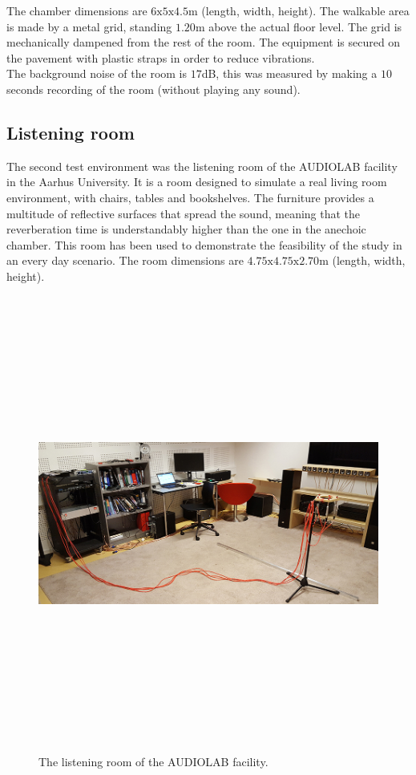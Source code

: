 The chamber dimensions are $6\text{x}5\text{x}4.5$m (length, width, height). The walkable area is made by a metal grid, standing $1.20$m above the actual floor level. The grid is mechanically dampened from the rest of the room. The equipment is secured on the pavement with plastic straps in order to reduce vibrations.
\\
The background noise of the room is \tld$17$dB, this was measured by making a $10$ seconds recording of the room (without playing any sound).

\subsection{Listening room}{}

The second test environment was the listening room of the AUDIOLAB facility in the Aarhus University. It is a room designed to simulate a real living room environment, with chairs, tables and bookshelves. The furniture provides a multitude of reflective surfaces that spread the sound, meaning that the reverberation time is understandably higher than the one in the anechoic chamber. This room has been used to demonstrate the feasibility of the study in an every day scenario.
The room dimensions are $4.75\text{x}4.75\text{x}2.70$m (length, width, height).

\begin{figure}[H]
\centering
\includegraphics[width=14.5cm,height=15cm,keepaspectratio]{Figures/listeningv2}
\decoRule
\caption[Listening chamber]{The listening room of the AUDIOLAB facility.}
\label{fig:listening}
\end{figure}

